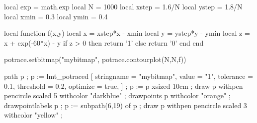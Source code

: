 \continuewhenlmtxmode


\startluacode
    local exp   = math.exp
    local N     = 1000
    local xstep = 1.6/N
    local ystep = 1.8/N
    local xmin  = 0.3
    local ymin  = 0.4

    local function f(x,y)
        local x = xstep*x - xmin
        local y = ystep*y - ymin
        local z = x + exp(-60*x) - y
        if z > 0 then
            return '1'
        else
            return '0'
        end
    end

    potrace.setbitmap("mybitmap", potrace.contourplot(N,N,f))
\stopluacode

\startMPpage[offset=1dk]
    path p ; p := lmt_potraced [
        stringname = "mybitmap",
        value      = "1",
        tolerance  = 0.1,
        threshold  = 0.2,
        optimize   = true,
    ] ;
    p := p xsized 10cm ;
    draw p withpen pencircle scaled 5 withcolor "darkblue" ;
    drawpoints p withcolor "orange" ;
    drawpointlabels p ;
    p := subpath(6,19) of p ;
    draw p withpen pencircle scaled 3 withcolor "yellow" ;
\stopMPpage

